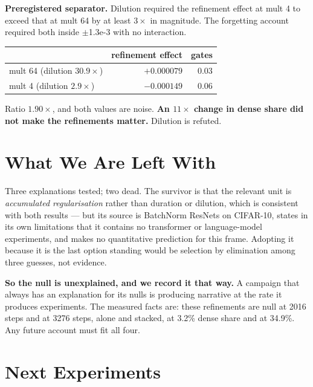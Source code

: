 \documentclass{article}
\begin{document}
\textbf{Preregistered separator.} Dilution required the refinement effect at mult 4 to exceed that at mult 64 by at least $3\times$ in magnitude. The forgetting account required both inside $\pm$1.3e-3 with no interaction.

\begin{center}\begin{small}
\begin{tabular}{lrr}
\toprule
 & refinement effect & gates \\
\midrule
mult 64 (dilution $30.9\times$) & $+0.000079$ & 0.03 \\
mult 4 (dilution $2.9\times$) & $-0.000149$ & 0.06 \\
\bottomrule
\end{tabular}
\end{small}\end{center}

Ratio $1.90\times$, and both values are noise. \textbf{An $11\times$ change in dense share did not make the refinements matter.} Dilution is refuted.

\section{What We Are Left With}
Three explanations tested; two dead. The survivor is that the relevant unit is \emph{accumulated regularisation} rather than duration or dilution, which is consistent with both results --- but its source is BatchNorm ResNets on CIFAR-10, states in its own limitations that it contains no transformer or language-model experiments, and makes no quantitative prediction for this frame. Adopting it because it is the last option standing would be selection by elimination among three guesses, not evidence.

\textbf{So the null is unexplained, and we record it that way.} A campaign that always has an explanation for its nulls is producing narrative at the rate it produces experiments. The measured facts are: these refinements are null at 2016 steps and at 3276 steps, alone and stacked, at 3.2\% dense share and at 34.9\%. Any future account must fit all four.

\section{Next Experiments}
\end{document}
